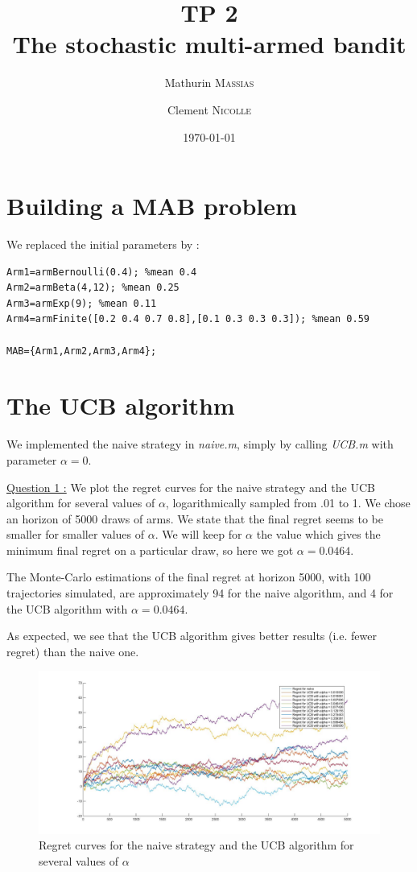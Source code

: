 \documentclass[11pt,a4paper]{article}
\title{TP 2 \\ The stochastic multi-armed bandit}
\author{Mathurin \textsc{Massias} \and Clement \textsc{Nicolle}}
\date{\today}
\begin{document}
\maketitle

\section{Building a MAB problem}
\hspace{-6mm} We replaced the initial parameters by :
\begin{verbatim}
Arm1=armBernoulli(0.4); %mean 0.4
Arm2=armBeta(4,12); %mean 0.25
Arm3=armExp(9); %mean 0.11
Arm4=armFinite([0.2 0.4 0.7 0.8],[0.1 0.3 0.3 0.3]); %mean 0.59

MAB={Arm1,Arm2,Arm3,Arm4};
\end{verbatim}

\section{The UCB algorithm}

\hspace{-6mm} We implemented the naive strategy in \textit{naive.m}, simply by calling \textit{UCB.m} with parameter $\alpha = 0$.

\underline{Question 1 :} We plot the regret curves for the naive strategy and the UCB algorithm for several values of $\alpha$, logarithmically sampled from .01 to 1. We chose an horizon of 5000 draws of arms. We state that the final regret seems to be smaller for smaller values of $\alpha$. We will keep for $\alpha$ the value which gives the minimum final regret on a particular draw, so here we got $\alpha = 0.0464$.

\medskip
The Monte-Carlo estimations of the final regret at horizon 5000, with 100 trajectories simulated, are approximately 94 for the naive algorithm, and 4 for the UCB algorithm with $\alpha = 0.0464$.

As expected, we see that the UCB algorithm gives better results (i.e. fewer regret) than the naive one.

\begin{figure}[H]
	\centering
	\noindent\includegraphics[scale=0.4]{regret_curves.jpg}
	\caption{Regret curves for the naive strategy and the UCB algorithm for several values of $\alpha$}
\end{figure}
\end{document}
